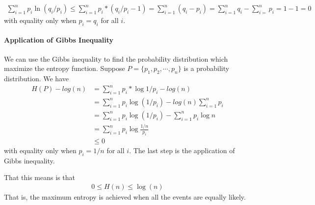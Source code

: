 \documentclass[10 pt,final]{article}
\newcommand{\impo}[1]{{\color{magenta} #1}}
\begin{document}
\impo{
\begin{align*}
\sum^n_{i=1} p_i \ln(q_i/p_i) \leq \sum^n_{i=1} p_i*(q_i/p_i -1) = \sum^n_{i=1} (q_i-p_i) = \sum^n_{i=1} q_i - \sum^n_{i=}p_i = 1 - 1 =0
\end{align*}
with equality only when $p_i = q_i$ for all $i$. }

\paragraph{Application of Gibbs Inequality} We can use the Gibbs inequality to find the probability distribution which maximize the entropy function. Suppose $P=\{p_1, p_2, \cdots, p_n\}$ is a probability distribution. We have
\begin{align*}
H(P) - log(n) & = \sum^n_{i=1} p_i *\log{1/p_i} - log(n) \\
& = \sum^n_{i=1} p_i \log(1/p_i) - log(n) \sum^n_{i=1} p_i \\
& = \sum^n_{i=1} p_i \log(1/p_i) - \sum^n_{i=1} p_i \log{n} \\
& = \sum^n_{i=1} p_i \log{\frac{1/n}{p_i}} \\
& \leq 0
\end{align*}
with equality only when $p_i = 1/n$ for all $i$. The last step is the application of Gibbs inequality.

That this means is that 
\impo{
\begin{align*}
0 \leq H(n) \leq \log(n)
\end{align*}
}
That is, the maximum entropy is achieved when all the events are equally likely.
\end{document}
